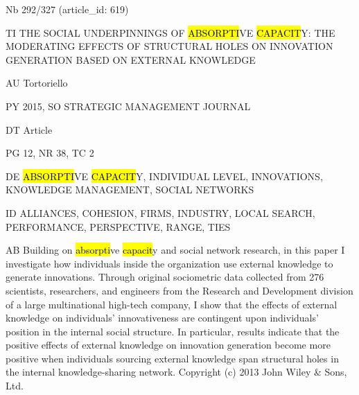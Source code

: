 \documentclass[a4paper]{article}
\begin{document}
\vspace*{-2cm}
Nb \tabto{0cm}292/327 (article\_id: 619)\par
TI \tabto{0cm}THE SOCIAL UNDERPINNINGS OF \hl{ABSORPTI}VE \hl{CAPACIT}Y: THE MODERATING EFFECTS OF STRUCTURAL HOLES ON INNOVATION GENERATION BASED ON EXTERNAL KNOWLEDGE\par
AU \tabto{0cm}Tortoriello\par
PY \tabto{0cm}2015, SO STRATEGIC MANAGEMENT JOURNAL\par
DT \tabto{0cm}Article\par
PG \tabto{0cm}12, NR 38, TC 2\par
DE \tabto{0cm}\hl{ABSORPTI}VE \hl{CAPACIT}Y, INDIVIDUAL LEVEL, INNOVATIONS, KNOWLEDGE MANAGEMENT, SOCIAL NETWORKS\par
ID \tabto{0cm}ALLIANCES, COHESION, FIRMS, INDUSTRY, LOCAL SEARCH, PERFORMANCE, PERSPECTIVE, RANGE, TIES\par
AB \tabto{0cm}Building on \hl{absorpti}ve \hl{capacit}y and social network research, in this paper I investigate how individuals inside the organization use external knowledge to generate innovations. Through original sociometric data collected from 276 scientists, researchers, and engineers from the Research and Development division of a large multinational high-tech company, I show that the effects of external knowledge on individuals' innovativeness are contingent upon individuals' position in the internal social structure. In particular, results indicate that the positive effects of external knowledge on innovation generation become more positive when individuals sourcing external knowledge span structural holes in the internal knowledge-sharing network. Copyright (c) 2013 John Wiley \& Sons, Ltd.\par
\clearpage
\end{document}
